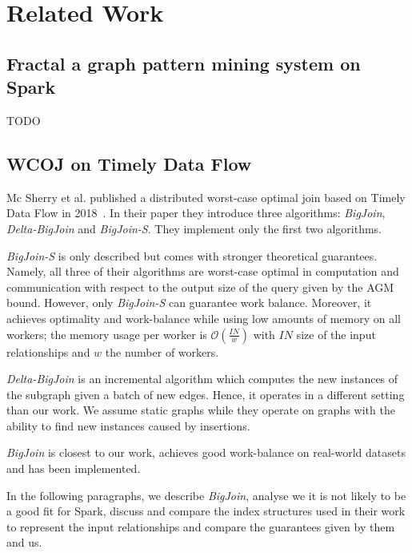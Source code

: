 \section{Related Work} \label{sec:related-work}






\subsection{Fractal a graph pattern mining system on Spark} \label{subsec:fractal}
TODO

\subsection{\textsc{WCOJ} on Timely Data Flow}\label{subsec:wcoj-timely-data-flow}

Mc Sherry et al. published a distributed worst-case optimal join based on Timely Data Flow in 2018~\cite{ammar2018distributed,naiad}.
In their paper they introduce three algorithms: \textit{BigJoin}, \textit{Delta-BigJoin} and \textit{BigJoin-S}.
They implement only the first two algorithms.

\textit{BigJoin-S} is only described but comes with stronger theoretical guarantees.
Namely, all three of their algorithms are worst-case optimal in computation and communication with respect to the output size of the query
given by the AGM bound.
However, only \textit{BigJoin-S} can guarantee work balance.
Moreover, it achieves optimality and work-balance while using low amounts of memory on all workers;
the memory usage per worker is $\mathcal{O} (\frac{IN}{w})$ with $IN$ size of the input relationships and $w$ the number of workers.

\textit{Delta-BigJoin} is an incremental algorithm which computes the new instances of the subgraph given a batch of new edges.
Hence, it operates in a different setting than our work.
We assume static graphs while they operate on graphs with the ability to find new instances caused by insertions.

\textit{BigJoin} is closest to our work, achieves good work-balance on real-world datasets and has been implemented.

In the following paragraphs, we describe \textit{BigJoin}, analyse we it is not likely to be a good fit for Spark,
discuss and compare the index structures used in their work to represent the input relationships and compare the
guarantees given by them and us.


